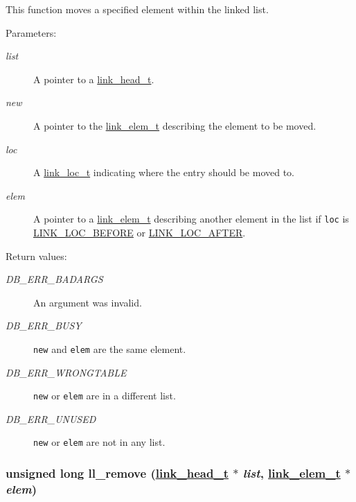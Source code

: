 This function moves a specified element within the linked list.\begin{Desc}
\item[Parameters: ]\par
\begin{description}
\item[{\em 
list}]A pointer to a \hyperlink{group__dbprim__link_a0}{link\_\-head\_\-t}. \item[{\em 
new}]A pointer to the \hyperlink{group__dbprim__link_a1}{link\_\-elem\_\-t} describing the element to be moved. \item[{\em 
loc}]A \hyperlink{group__dbprim__link_a4}{link\_\-loc\_\-t} indicating where the entry should be moved to. \item[{\em 
elem}]A pointer to a \hyperlink{group__dbprim__link_a1}{link\_\-elem\_\-t} describing another element in the list if {\tt loc} is \hyperlink{group__dbprim__link_a26a133}{LINK\_\-LOC\_\-BEFORE} or \hyperlink{group__dbprim__link_a26a134}{LINK\_\-LOC\_\-AFTER}.\end{description}
\end{Desc}
\begin{Desc}
\item[Return values: ]\par
\begin{description}
\item[{\em 
DB\_\-ERR\_\-BADARGS}]An argument was invalid. \item[{\em 
DB\_\-ERR\_\-BUSY}]{\tt new} and {\tt elem} are the same element. \item[{\em 
DB\_\-ERR\_\-WRONGTABLE}]{\tt new} or {\tt elem} are in a different list. \item[{\em 
DB\_\-ERR\_\-UNUSED}]{\tt new} or {\tt elem} are not in any list. \end{description}
\end{Desc}
\hypertarget{group__dbprim__link_a8}{
\subsubsection[ll\_\-remove]{\setlength{\rightskip}{0pt plus 5cm}unsigned long ll\_\-remove (\hyperlink{group__dbprim__link_a0}{link\_\-head\_\-t} $\ast$ {\em list}, \hyperlink{group__dbprim__link_a1}{link\_\-elem\_\-t} $\ast$ {\em elem})}}
\label{group__dbprim__link_a8}


